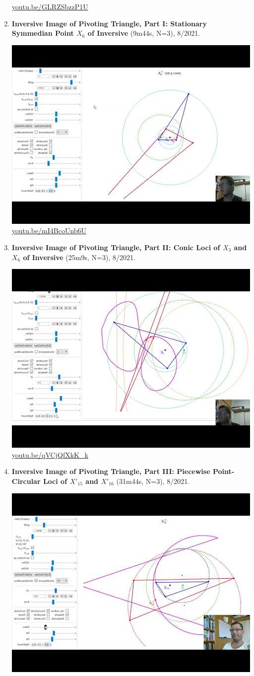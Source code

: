 \documentclass[12pt]{amsart}
\begin{document}
\begin{enumerate}[resume]
\begin{center}
\href{https://youtu.be/GLRZSbzzP1U}{\url{youtu.be/GLRZSbzzP1U}}\end{center}
% 
\item \textbf{Inversive Image of Pivoting Triangle, Part I: Stationary Symmedian Point $X_{6}$ of Inversive} (9m44s, N=3), 8/2021. 
\begin{center}\includegraphics[width=.5\textwidth]{pics/mI4BcoUnb6U.jpg} \\ 
\href{https://youtu.be/mI4BcoUnb6U}{\url{youtu.be/mI4BcoUnb6U}}\end{center}
% 
\item \textbf{Inversive Image of Pivoting Triangle, Part II: Conic Loci of $X_{3}$ and $X_{6}$ of Inversive} (25m9s, N=3), 8/2021. 
\begin{center}\includegraphics[width=.5\textwidth]{pics/qVCjQfXkK_k.jpg} \\ 
\href{https://youtu.be/qVCjQfXkK_k}{\url{youtu.be/qVCjQfXkK\_k}}\end{center}
% 
\item \textbf{Inversive Image of Pivoting Triangle, Part III: Piecewise Point-Circular Loci of $X'_{15}$ and $X'_{16}$} (31m44s, N=3), 8/2021. 
\begin{center}\includegraphics[width=.5\textwidth]{pics/iFEHMSELf7U.jpg} \\ 

\end{center}
\end{enumerate}
\end{document}
